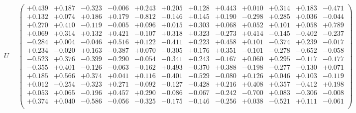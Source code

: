\documentclass[9pt]{article}
\theoremstyle{plain}
\theoremstyle{definition}
\theoremstyle{remark}
\numberwithin{equation}{section}
\begin{document}
$U = \left(
\begin{array}{
cccccccccccc}
+0.439 & +0.187 & -0.323 & -0.006 & +0.243 & +0.205 & +0.128 & +0.443 & +0.010 & +0.314 & +0.183 & -0.471 \\
+0.132 & +0.074 & +0.186 & +0.179 & -0.812 & -0.146 & +0.145 & +0.190 & -0.298 & +0.285 & +0.036 & -0.044 \\
+0.270 & +0.410 & -0.119 & -0.005 & +0.096 & +0.015 & +0.303 & +0.068 & +0.052 & +0.101 & +0.058 & +0.789 \\
+0.069 & +0.314 & +0.132 & +0.421 & -0.107 & +0.318 & +0.323 & -0.273 & +0.414 & -0.145 & -0.402 & -0.237 \\
-0.284 & +0.004 & -0.046 & +0.516 & +0.122 & -0.411 & +0.223 & +0.458 & +0.101 & -0.374 & +0.239 & -0.017 \\
+0.234 & -0.020 & +0.163 & -0.387 & +0.070 & -0.305 & +0.176 & +0.351 & -0.101 & -0.278 & -0.652 & -0.058 \\
-0.523 & +0.376 & -0.399 & -0.290 & -0.054 & -0.341 & +0.243 & -0.167 & +0.060 & +0.295 & -0.117 & -0.177 \\
-0.355 & +0.401 & -0.126 & -0.063 & -0.162 & +0.493 & -0.370 & +0.388 & -0.198 & -0.277 & -0.130 & +0.071 \\
+0.185 & +0.566 & +0.374 & +0.041 & +0.116 & -0.401 & -0.529 & -0.080 & +0.126 & +0.046 & +0.103 & -0.119 \\
+0.012 & -0.254 & -0.323 & +0.271 & -0.092 & -0.127 & -0.428 & +0.216 & +0.408 & +0.357 & -0.412 & +0.198 \\
+0.053 & +0.065 & -0.196 & +0.457 & +0.290 & -0.086 & -0.067 & -0.242 & -0.700 & +0.083 & -0.306 & -0.008 \\
+0.374 & +0.040 & -0.586 & -0.056 & -0.325 & -0.175 & -0.146 & -0.256 & +0.038 & -0.521 & +0.111 & -0.061 \\
\end{array}
\right)$ \newline 
\end{document}
